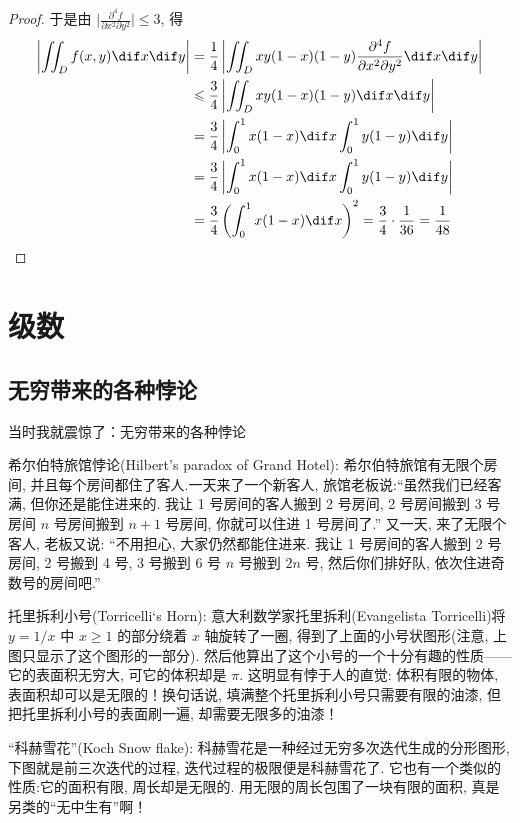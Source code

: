 \documentclass[color=green,titlestyle=hang]{elegantbook}%
\begin{document}
\begin{proof}
于是由 $\bigg|\frac{\partial^4f}{\partial x^2\partial y^2}\bigg|\leqslant3$, 得
\begin{align*} 
\left|\iint_{D} f(x, y)\dif x\dif y\right|
&=\frac{1}{4}\left|\iint_{D} x y(1-x)(1-y)\frac{\partial^4 f}{\partial x^2\partial y^2}\dif x\dif y\right|\\ 
&\leqslant\frac{3}{4}\left|\iint_{D} x y(1-x)(1-y)\dif x\dif y\right| \\
&= \frac{3}{4}\left|\int_0^1 x(1-x)\dif x\int_0^1y(1-y)\dif y\right|\\
&=\frac{3}{4}\left|\int_0^1x(1-x)\dif x\int_0^1y(1-y)\dif y\right|\\
&=\frac{3}{4}\left(\int_0^1x(1-x)\dif x\right)^2=\frac{3}{4} \cdot \frac{1}{36}=\frac{1}{48}
\end{align*}
\end{proof}

\chapter{级数}

\section{无穷带来的各种悖论}
当时我就震惊了：无穷带来的各种悖论

\par 希尔伯特旅馆悖论(Hilbert's paradox of Grand Hotel): 希尔伯特旅馆有无限个房间, 并且每个房间都住了客人.一天来了一个新客人, 旅馆老板说:“虽然我们已经客满, 但你还是能住进来的. 我让 1 号房间的客人搬到 2 号房间, 2 号房间搬到 3 号房间 $n$ 号房间搬到 $n+1$ 号房间, 你就可以住进 1 号房间了.” 又一天, 来了无限个客人, 老板又说: “不用担心, 大家仍然都能住进来. 我让 1 号房间的客人搬到 2 号房间, 2 号搬到 4 号, 3 号搬到 6 号 $n$ 号搬到 $2n$ 号, 然后你们排好队, 依次住进奇数号的房间吧.”

\par 托里拆利小号(Torricelli‘s Horn): 意大利数学家托里拆利(Evangelista Torricelli)将 $y=1/x$ 中 $x\geqslant1$ 的部分绕着 $x$ 轴旋转了一圈, 得到了上面的小号状图形(注意, 上图只显示了这个图形的一部分). 然后他算出了这个小号的一个十分有趣的性质——它的表面积无穷大, 可它的体积却是 $\pi$. 这明显有悖于人的直觉: 体积有限的物体, 表面积却可以是无限的！换句话说, 填满整个托里拆利小号只需要有限的油漆, 但把托里拆利小号的表面刷一遍, 却需要无限多的油漆！

\par “科赫雪花”(Koch Snow flake): 科赫雪花是一种经过无穷多次迭代生成的分形图形, 下图就是前三次迭代的过程, 迭代过程的极限便是科赫雪花了. 它也有一个类似的性质:它的面积有限, 周长却是无限的. 用无限的周长包围了一块有限的面积, 真是另类的“无中生有”啊！
\end{document}
